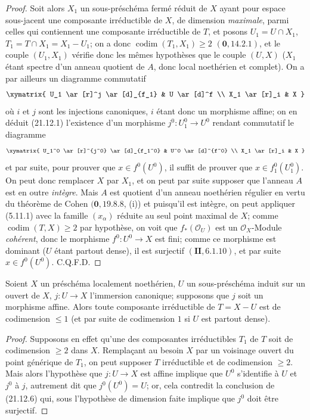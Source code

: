 \begin{proof}
Soit alors $X_1$ un sous-préschéma fermé réduit de $X$ ayant pour espace sous-jacent
une composante irréductible de $X$, de dimension \emph{maximale}, parmi celles qui
contiennent une composante irréductible de $T$, et posons
$U_1=U\cap X_1$, $T_1=T\cap X_1=X_1-U_1$; on a donc
$\operatorname{codim}(T_1,X_1)\geq2$ $(\mathbf 0, 14.2.1)$, et le couple $(U_1,X_1)$
vérifie donc les mêmes hypothèses que le couple $(U,X)$ ($X_1$ étant spectre d'un
anneau quotient de $A$, donc local noethérien et complet). On a par ailleurs un
diagramme commutatif
\[
  \xymatrix{
    U_1 \ar[r]^j \ar[d]_{f_1} & U \ar[d]^f \\
    X_1 \ar[r]_i & X
  }
\]
où $i$ et $j$ sont les injections canoniques, $i$ étant donc un morphisme affine; on en
déduit (21.12.1) l'existence d'un morphisme $j^0:U_1^0\to U^0$ rendant commutatif le
diagramme
\[
  \xymatrix{
    U_1^0 \ar[r]^{j^0} \ar[d]_{f_1^0} & U^0 \ar[d]^{f^0} \\
    X_1 \ar[r]_i & X
  }
\]
et par suite, pour prouver que $x\in f^0(U^0)$, il suffit de prouver que
$x\in f_1^0(U_1^0)$. On peut donc remplacer $X$ par $X_1$, et on peut par suite
supposer que l'anneau $A$ est en outre \emph{intègre}. Mais $A$ est quotient d'un
anneau noethérien régulier en vertu du théorème de Cohen $(\mathbf 0, 19.8.8$, (i)) et
puisqu'il est intègre, on peut appliquer (5.11.1) avec la famille $(x_\alpha)$ réduite au
seul point maximal de $X$; comme $\operatorname{codim}(T,X)\geq2$ par hypothèse, on
voit que $f_*(\mathcal O_U)$ est un $\mathcal O_X$-Module \emph{cohérent}, donc le
morphisme $f^0:U^0\to X$ est fini; comme ce morphisme est dominant ($U$ étant partout
dense), il est surjectif $(\mathbf{II}, 6.1.10)$, et par suite $x\in f^0(U^0)$. C.Q.F.D.
\end{proof}

\begin{corollary}[21.12.7]
\label{IV.21.12.7}
Soient $X$ un préschéma localement noethérien, $U$ un sous-préschéma induit sur un
ouvert de $X$, $j:U\to X$ l'immersion canonique; supposons que $j$ soit un morphisme
affine. Alors toute composante irréductible de $T=X-U$ est de codimension $\leq1$
(et par suite de codimension $1$ si $U$ est partout dense).
\end{corollary}

\begin{proof}
Supposons en effet qu'une des composantes irréductibles $T_1$ de $T$ soit de
codimension $\geq2$ dans $X$. Remplaçant au besoin $X$ par un voisinage ouvert du
point générique de $T_1$, on peut supposer $T$ irréductible et de codimension $\geq2$.
Mais alors l'hypothèse
que $j:U\to X$ est affine implique que $U^0$ s'identifie à $U$ et $j^0$ à $j$,
autrement dit que $j^0(U^0)=U$; or, cela contredit la conclusion de (21.12.6) qui,
sous l'hypothèse de dimension faite implique que $j^0$ doit être surjectif.
\end{proof}

